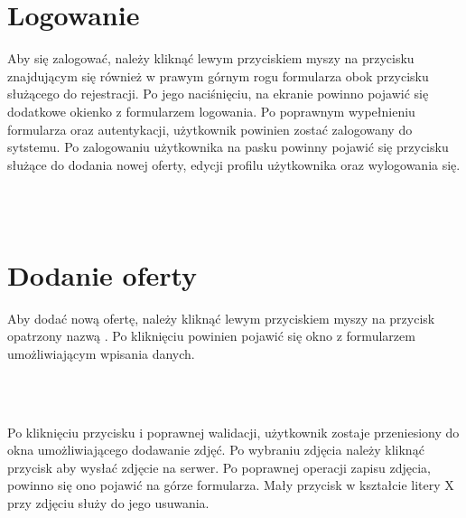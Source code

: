 \newpage


\section{Logowanie}
\label{sec:logowanie}
Aby się zalogować, należy kliknąć lewym przyciskiem myszy na przycisku  znajdującym się również w prawym górnym rogu formularza obok przycisku służącego do rejestracji. Po jego naciśnięciu, na ekranie powinno pojawić się dodatkowe okienko z formularzem logowania. Po poprawnym wypełnieniu formularza oraz autentykacji, użytkownik powinien zostać zalogowany do sytstemu. 
Po zalogowaniu użytkownika na pasku powinny pojawić się przycisku służące do dodania nowej oferty, edycji profilu użytkownika oraz wylogowania się.\\
\\

\begin{minipage}{\linewidth}
\label{login}
\end{minipage}\\

\newpage


\section{Dodanie oferty}
Aby dodać nową ofertę, należy kliknąć lewym przyciskiem myszy na przycisk opatrzony nazwą . Po kliknięciu powinien pojawić się okno z formularzem umożliwiającym wpisania danych.\\
\\
\begin{minipage}{\linewidth}
\label{add-offer1}
\end{minipage}\\

\newpage

Po kliknięciu przycisku  i poprawnej walidacji, użytkownik zostaje przeniesiony do okna umożliwiającego dodawanie zdjęć. Po wybraniu zdjęcia należy kliknąć przycisk  aby wysłać zdjęcie na serwer. Po poprawnej operacji zapisu zdjęcia, powinno się ono pojawić na górze formularza. Mały przycisk w kształcie litery X przy zdjęciu służy do jego usuwania.\\
\\
\begin{minipage}{\linewidth}
\label{add-offer2}
\end{minipage}\\

